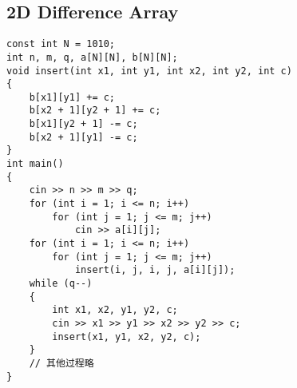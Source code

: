 \subsection{2D Difference Array}
\begin{lstlisting}
const int N = 1010;
int n, m, q, a[N][N], b[N][N];
void insert(int x1, int y1, int x2, int y2, int c)
{
    b[x1][y1] += c;
    b[x2 + 1][y2 + 1] += c;
    b[x1][y2 + 1] -= c;
    b[x2 + 1][y1] -= c;
}
int main()
{
    cin >> n >> m >> q;
    for (int i = 1; i <= n; i++)
        for (int j = 1; j <= m; j++)
            cin >> a[i][j];
    for (int i = 1; i <= n; i++)
        for (int j = 1; j <= m; j++)
            insert(i, j, i, j, a[i][j]);
    while (q--)
    {
        int x1, x2, y1, y2, c;
        cin >> x1 >> y1 >> x2 >> y2 >> c;
        insert(x1, y1, x2, y2, c);
    }
    // 其他过程略
}
\end{lstlisting}
